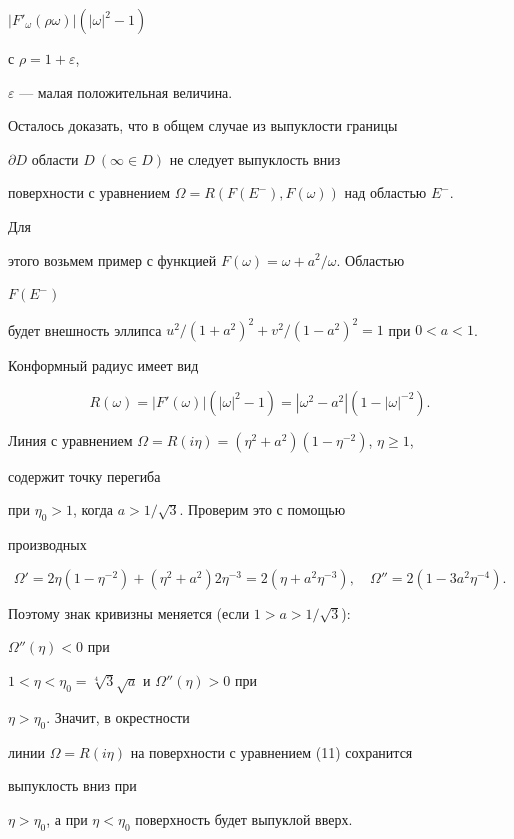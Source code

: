 \begin{pf}
$|F'_\omega(\rho\omega)|(|\omega|^2-1)$ 


с $\rho=1+\varepsilon$,\linebreak


$\varepsilon$ --- малая положительная величина. 


 


Осталось доказать, что в общем случае из выпуклости границы 


$\partial D$ области $D\ (\infty\in D)$ не следует выпуклость вниз 


поверхности с уравнением $\Omega=R(F(E^-),F(\omega))$ над областью $E^-$. 


Для 


этого возьмем пример с функцией $F(\omega)=\omega+a^2/\omega$. Областью 


$F(E^-)$ 


будет внешность эллипса $u^2/(1+a^2)^2+v^2/(1-a^2)^2=1$ при $0<a<1$. 


Конформный радиус имеет вид 


\begin{equation} 


R(\omega)=|F'(\omega)|(|\omega|^2-1)=|\omega^2-a^2| 


(1-|\omega|^{-2}). 


\end{equation} 





Линия с уравнением $\Omega=R(i\eta)=(\eta^2+a^2)(1-\eta^{-2})$, $\eta\ge1$, 


содержит точку перегиба 


при $\eta_0>1$, когда $a>1/\sqrt{3}$. Проверим это с помощью 


производных 


$$ 


\Omega'=2\eta(1-\eta^{-2})+(\eta^2+a^2)2\eta^{-3}= 


2(\eta+a^2\eta^{-3}),\quad 


\Omega''=2(1-3a^2\eta^{-4}). 


$$ 


Поэтому знак кривизны меняется (если $1>a>1/\sqrt{3}$): 


$\Omega''(\eta)<0$ при 


$1<\eta<\eta_0=\sqrt[4]{3}\sqrt{a}$ и $\Omega''(\eta)>0$ при 


$\eta>\eta_0$. Значит, в окрестности 


линии $\Omega=R(i\eta)$ на поверхности с уравнением (11) сохранится 


выпуклость вниз при 


$\eta>\eta_0$, а при $\eta<\eta_0$ поверхность будет выпуклой вверх. 


\end{pf} 


